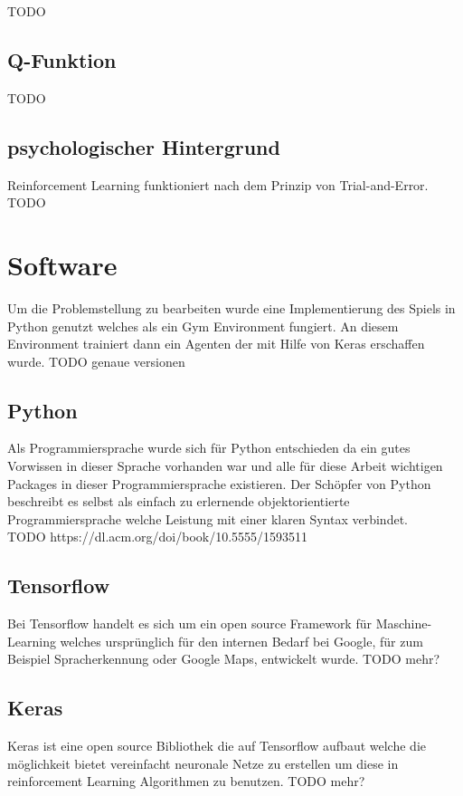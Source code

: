 \colorbox{red!30}{TODO} %

\subsection{Q-Funktion}
\colorbox{red!30}{TODO} %

\subsection{psychologischer Hintergrund}
Reinforcement Learning funktioniert nach dem Prinzip von Trial-and-Error.\\
\colorbox{red!30}{TODO} %



\section{Software}
Um die Problemstellung zu bearbeiten wurde eine Implementierung des Spiels in Python genutzt welches als ein Gym Environment fungiert. An diesem Environment trainiert dann ein Agenten der mit Hilfe von  Keras erschaffen wurde.
\colorbox{red!30}{TODO genaue versionen}

\subsection{Python}
Als Programmiersprache wurde sich für Python entschieden da ein gutes Vorwissen in dieser Sprache vorhanden war und alle für diese Arbeit wichtigen Packages in dieser Programmiersprache existieren.
Der Schöpfer von Python beschreibt es selbst als einfach zu erlernende objektorientierte Programmiersprache welche Leistung mit einer klaren Syntax verbindet.\\
\colorbox{red!30}{TODO https://dl.acm.org/doi/book/10.5555/1593511}

\subsection{Tensorflow}
Bei Tensorflow handelt es sich um ein open source Framework für Maschine-Learning welches ursprünglich für den internen Bedarf bei Google, für zum Beispiel Spracherkennung oder Google Maps, entwickelt wurde. 
\colorbox{red!30}{TODO mehr?}

\subsection{Keras}
Keras ist eine open source Bibliothek die auf Tensorflow aufbaut welche die möglichkeit bietet vereinfacht neuronale Netze zu erstellen um diese in reinforcement Learning Algorithmen zu benutzen.
\colorbox{red!30}{TODO mehr?}

